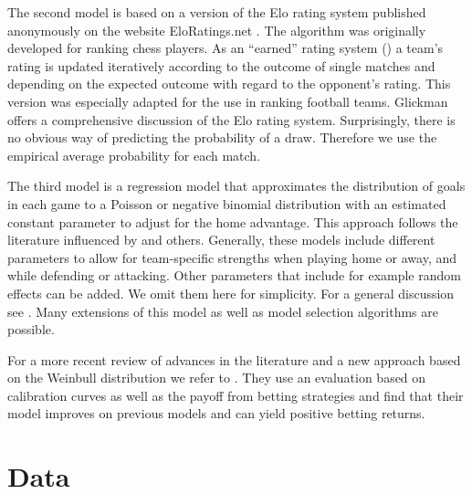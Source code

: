 \documentclass[12pt,a4paper]{article}
\begin{document}
The second model is based on a version of the Elo rating system
published anonymously on the website EloRatings.net
\autocite*{eloratings}. The algorithm was originally developed for
ranking chess players. As an \enquote{earned} rating system
(\textcite{lasek2013}) a team's rating is updated iteratively according
to the outcome of single matches and depending on the expected outcome
with regard to the opponent's rating. This version was especially
adapted for the use in ranking football teams. Glickman
\autocite*{glickman1995} offers a comprehensive discussion of the Elo
rating system. Surprisingly, there is no obvious way of predicting the
probability of a draw. Therefore we use the empirical average
probability for each match.

The third model is a regression model that approximates the distribution
of goals in each game to a Poisson or negative binomial distribution
with an estimated constant parameter to adjust for the home advantage.
This approach follows the literature influenced by \textcite{maher1982}
and others. Generally, these models include different parameters to
allow for team-specific strengths when playing home or away, and while
defending or attacking. Other parameters that include for example random
effects can be added. We omit them here for simplicity. For a general
discussion see \textcite{karlis2003}. Many extensions of this model as
well as model selection algorithms are possible.

For a more recent review of advances in the literature and a new
approach based on the Weinbull distribution we refer to
\textcite{boshnakov2017}. They use an evaluation based on calibration
curves as well as the payoff from betting strategies and find that their
model improves on previous models and can yield positive betting
returns.

\hypertarget{data}{%
\section{Data}\label{data}}
\end{document}
